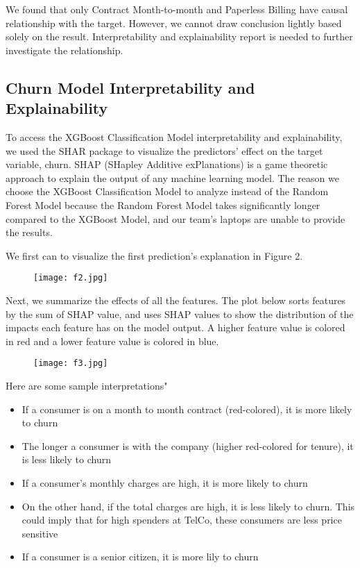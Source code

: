 \documentclass[12pt]{article}
\begin{document}
We found that only Contract Month-to-month and Paperless Billing have causal relationship with the target. However, we cannot draw conclusion lightly based solely on the result. Interpretability and explainability report is needed to further investigate the relationship.

\subsection{Churn Model Interpretability and Explainability} \label{sec:Interpretability}

To access the XGBoost Classification Model interpretability and explainability, we used the SHAR package to visualize the predictors' effect on the target variable, churn. SHAP (SHapley Additive exPlanations) is a game theoretic approach to explain the output of any machine learning model. The reason we choose the XGBoost Classification Model to analyze instead of the Random Forest Model because the Random Forest Model takes significantly longer compared to the XGBoost Model, and our team's laptops are unable to provide the results. 

We first can to visualize the first prediction's explanation in Figure 2.

\begin{figure}[htbp]
\centering
\texttt{[image: f2.jpg]}
\caption{}\label{fig:}
\end{figure}

Next, we summarize the effects of all the features. The plot below sorts features by the sum of SHAP value, and uses SHAP values to show the distribution of the impacts each feature has on the model output. A higher feature value is colored in red and a lower feature value is colored in blue. 

\begin{figure}[htbp]
\centering
\texttt{[image: f3.jpg]}
\caption{}\label{fig:}
\end{figure}

Here are some sample interpretations"
\begin{itemize}
	\item If a consumer is on a month to month contract (red-colored), it is more likely to churn
	\item The longer a consumer is with the company (higher red-colored for tenure), it is less likely to churn
	\item If a consumer's monthly charges are high, it is more likely to churn
	\item On the other hand, if the total charges are high, it is less likely to churn. This could imply that for high spenders at TelCo, these consumers are less price sensitive
	\item If a consumer is a senior citizen, it is more lily to churn
\end{itemize}
\end{document}
